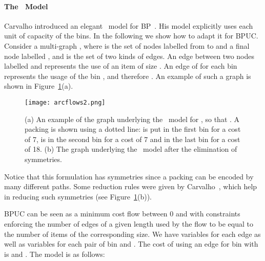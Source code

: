 \paragraph{\textbf{The \arcflow\ Model}}
Carvalho introduced an elegant \arcflow\ model
 for BP~\cite{Carvalho99,DBLP:journals/eor/Carvalho02}. His model explicitly uses each unit of capacity  of the bins. In the following we show how to adapt it for BPUC.
Consider a multi-graph , where  is the set  of  nodes labelled from  to  and a final node labelled , and   is the set of  two kinds of edges. An edge   between two nodes labelled  and  represents the use of an item of size . 
 An edge of  for each bin  represents the usage  of the bin , and therefore . An example of such a graph is shown in Figure~\ref{example2}(a).
\begin{figure}[t!]
\centering
\texttt{[image: arcflows2.png]}
\caption{(a) An example of the graph underlying the \arcflow\ model for ,  so that . A packing is shown using a dotted line:  is put in the first bin for a cost of 7,  is in the second bin for a cost of 7 and  in the last bin for a cost of 18.
(b) The graph underlying the \arcflow\ model after the elimination of symmetries.}
\label{example2}
\end{figure}
Notice that this formulation has symmetries since a packing can be encoded by many different paths.
Some reduction rules were given by Carvalho~\cite{Carvalho99}, which help in reducing such symmetries (see Figure~\ref{example2}(b)).







BPUC can be seen  as a minimum cost flow between 0 and  with constraints enforcing the number of edges of a given length used by the flow to be equal to the number of items of the corresponding size. We have variables  for each edge  as well as variables  for each pair of bin  and . 
The  cost of using an edge  for bin  with  is  and . The model is as follows:

